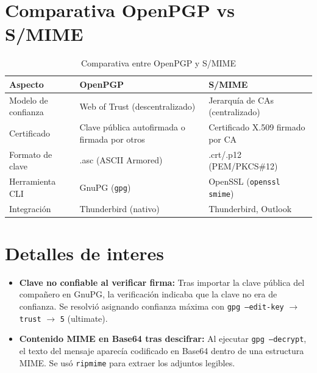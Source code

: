 \documentclass[12pt,a4paper]{report}
\begin{document}
\section{Comparativa OpenPGP vs S/MIME}

\begin{table}[H]
    \centering
    \caption{Comparativa entre OpenPGP y S/MIME}
    \begin{tabularx}{\textwidth}{l|X|X}
        \toprule
        \textbf{Aspecto} & \textbf{OpenPGP} & \textbf{S/MIME} \\
        \midrule
        Modelo de confianza & Web of Trust (descentralizado) & Jerarquía de CAs (centralizado) \\
        Certificado & Clave pública autofirmada o firmada por otros & Certificado X.509 firmado por CA \\
        Formato de clave & .asc (ASCII Armored) & .crt/.p12 (PEM/PKCS\#12) \\
        Herramienta CLI & GnuPG (\texttt{gpg}) & OpenSSL (\texttt{openssl smime}) \\
        Integración & Thunderbird (nativo) & Thunderbird, Outlook \\
        \bottomrule
    \end{tabularx}
\end{table}

\section{Detalles de interes}

\begin{itemize}[label=\textbullet]
    \item \textbf{Clave no confiable al verificar firma:} Tras importar la clave pública del compañero en GnuPG, la verificación indicaba que la clave no era de confianza. Se resolvió asignando confianza máxima con \texttt{gpg --edit-key} $\rightarrow$ \texttt{trust} $\rightarrow$ \texttt{5} (ultimate).
    \item \textbf{Contenido MIME en Base64 tras descifrar:} Al ejecutar \texttt{gpg --decrypt}, el texto del mensaje aparecía codificado en Base64 dentro de una estructura MIME. Se usó \texttt{ripmime} para extraer los adjuntos legibles.
\end{itemize}

\end{document}
